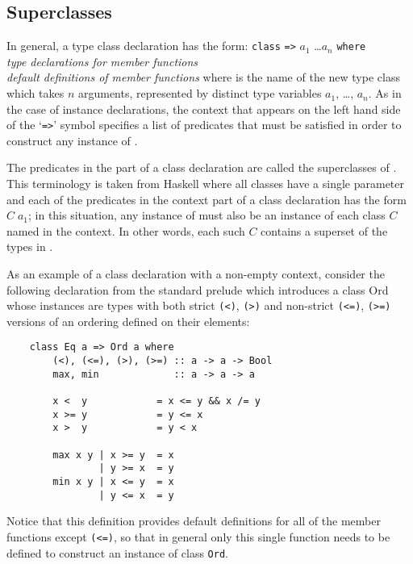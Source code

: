 \subsection{Superclasses}
In general, a type class declaration has the form:
\BQ
     \verb"class"  \verb"=>" 
              $a_1$ \dots $a_n$ \verb"where" \\
      {\em type declarations for member functions} \\
      {\em default definitions of member functions}
\EQ
where  is the name of the new type class which takes $n$  arguments,
represented by distinct type variables $a_1$, \dots, $a_n$.  As in the case  of
instance declarations, the context that appears on the left  hand  side
of the `\verb"=>"'  symbol  specifies  a  list  of  predicates  that  must  be
satisfied in order to construct any instance of .

The predicates in the  part of a class  declaration  are  called
the superclasses of .  This  terminology  is  taken  from  Haskell
where all classes have a single parameter and each of the predicates in
the context part of a class declaration has the  form  $C\; a_1$;  in  this
situation, any instance of  must also be an instance of each class
$C$ named in the context.   
In  other  words,  each  such  $C$  contains  a
superset of the types in .

As an example of a class declaration with a non-empty context, consider
the following declaration from the standard prelude which introduces  a
class Ord whose instances are types  with  both  strict  \verb"(<)",  
\verb"(>)"  and
non-strict  \verb"(<=)",  \verb"(>=)"  
versions  of  an  ordering  defined  on  their
elements:
\begin{verbatim}
    class Eq a => Ord a where
        (<), (<=), (>), (>=) :: a -> a -> Bool
        max, min             :: a -> a -> a

        x <  y            = x <= y && x /= y
        x >= y            = y <= x
        x >  y            = y < x

        max x y | x >= y  = x
                | y >= x  = y
        min x y | x <= y  = x
                | y <= x  = y
\end{verbatim}
Notice that this definition provides default definitions for all of the
member functions except \verb"(<=)", so  that  in  general  only  this  single
function needs to be defined to construct an instance of class \verb"Ord".

